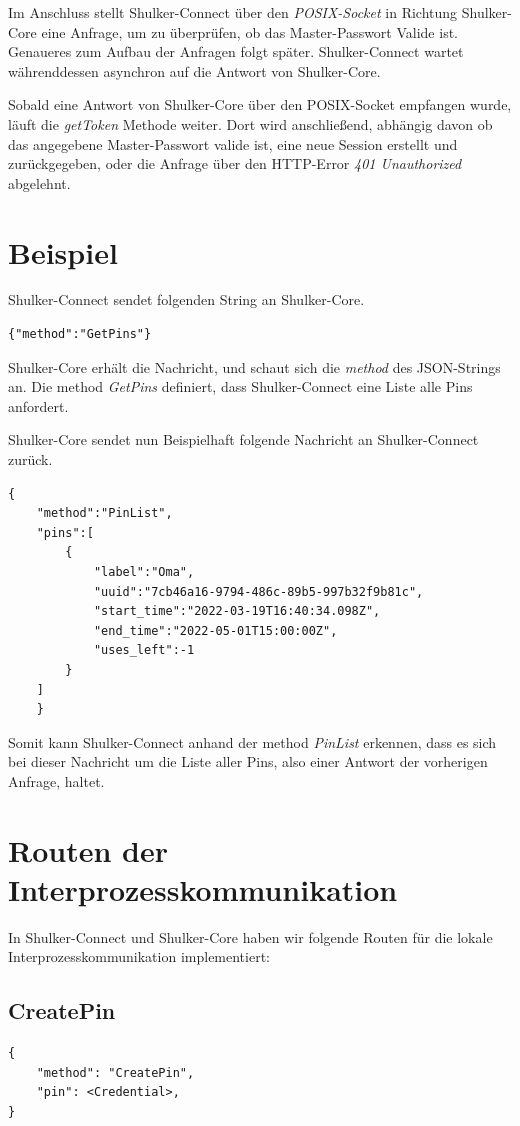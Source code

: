 Im Anschluss stellt Shulker-Connect über den \textit{POSIX-Socket} in Richtung Shulker-Core eine Anfrage, um zu
überprüfen, ob das Master-Passwort Valide ist. Genaueres zum Aufbau der Anfragen folgt später.
Shulker-Connect wartet währenddessen asynchron auf die Antwort von Shulker-Core.

Sobald eine Antwort von Shulker-Core über den POSIX-Socket empfangen wurde, läuft die \textit{getToken} 
Methode weiter. Dort wird anschließend, abhängig davon ob das angegebene Master-Passwort valide ist, eine neue Session 
erstellt und zurückgegeben, oder die Anfrage über den HTTP-Error \textit{401 Unauthorized} abgelehnt.

\section{Beispiel}
Shulker-Connect sendet folgenden String an Shulker-Core.
\begin{lstlisting}
{"method":"GetPins"}
\end{lstlisting}
Shulker-Core erhält die Nachricht, und schaut sich die \textit{method} des JSON-Strings an.
Die method \textit{GetPins} definiert, dass Shulker-Connect eine Liste alle Pins anfordert.

Shulker-Core sendet nun Beispielhaft folgende Nachricht an Shulker-Connect zurück.
\begin{lstlisting}
{
    "method":"PinList",
    "pins":[
        {
            "label":"Oma",
            "uuid":"7cb46a16-9794-486c-89b5-997b32f9b81c",
            "start_time":"2022-03-19T16:40:34.098Z",
            "end_time":"2022-05-01T15:00:00Z",
            "uses_left":-1
        }
    ]
    }
\end{lstlisting}
Somit kann Shulker-Connect anhand der method \textit{PinList} erkennen, dass es sich bei dieser Nachricht um die Liste
aller Pins, also einer Antwort der vorherigen Anfrage, haltet.


\section{Routen der Interprozesskommunikation}
In Shulker-Connect und Shulker-Core haben wir folgende Routen für die lokale Interprozesskommunikation implementiert:

\subsection{CreatePin}
\begin{lstlisting}
{
    "method": "CreatePin",
    "pin": <Credential>,
}
\end{lstlisting}

